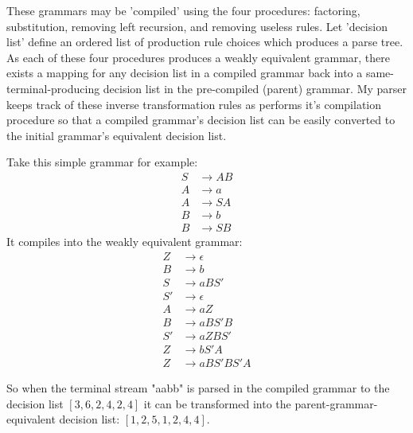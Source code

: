 \documentclass[11pt]{article}
\begin{document}
These grammars may be 'compiled' using the four procedures:
factoring, substitution, removing left recursion, and removing useless
rules. Let 'decision list' define an ordered list of production rule
choices which produces a parse tree.
As each of these four procedures produces a weakly equivalent grammar,
there exists a mapping for any decision list in a compiled grammar
back into a same-terminal-producing decision list in the pre-compiled (parent) grammar.
My parser keeps track of these inverse transformation rules as performs
it's compilation procedure so that a compiled grammar's decision list can be easily
converted to the initial grammar's equivalent decision list. 

Take this simple grammar for example:
\setcounter{equation}{0}
\begin{align}
S &\rightarrow A B\\
A &\rightarrow a\\
A &\rightarrow S A\\
B &\rightarrow b\\
B &\rightarrow S B
\end{align}
It compiles into the weakly equivalent grammar:
\setcounter{equation}{0}
\begin{align}
Z &\rightarrow \epsilon\\
B &\rightarrow b\\
S &\rightarrow a B S'\\
S' &\rightarrow \epsilon\\
A &\rightarrow a Z\\
B &\rightarrow a B S' B\\
S' &\rightarrow a Z B S'\\
Z &\rightarrow b S' A\\
Z &\rightarrow a B S' B S' A
\end{align}

So when the terminal stream "aabb" is parsed in the compiled
grammar to the decision list $[3, 6, 2, 4, 2, 4]$ it can be transformed
into the parent-grammar-equivalent decision list: $[1, 2, 5, 1, 2, 4, 4]$.
\end{document}
